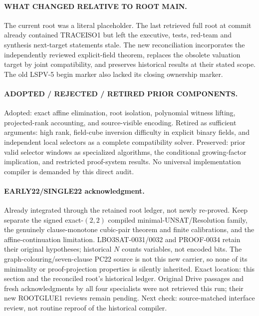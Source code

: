 \documentclass[11pt]{article}
\begin{document}
\paragraph{WHAT CHANGED RELATIVE TO ROOT MAIN.}
The current root was a literal placeholder. The last retrieved full root at
commit  already contained
TRACEISO1 but left the executive, tests, red-team and synthesis next-target
statements stale. The new reconciliation incorporates the independently
reviewed explicit-field theorem, replaces the obsolete valuation target by
joint compatibility, and preserves historical results at their stated scope.
The old LSPV-5 begin marker also lacked its closing ownership marker.

\paragraph{ADOPTED / REJECTED / RETIRED PRIOR COMPONENTS.}
Adopted: exact affine elimination, root isolation, polynomial witness lifting,
projected-rank accounting, and source-visible encoding. Retired as sufficient
arguments: high rank, field-cube inversion difficulty in explicit binary
fields, and independent local selectors as a complete compatibility solver.
Preserved: prior valid selector windows as specialized algorithms, the
conditional growing-factor implication, and restricted proof-system results.
No universal implementation compiler is demanded by this direct audit.

\paragraph{EARLY22/SINGLE22 acknowledgment.}
Already integrated through the retained root ledger, not newly re-proved.
Keep separate the signed exact-$(2,2)$ compiled minimal-UNSAT/Resolution
family, the genuinely clause-monotone cubic-pair theorem and finite
calibrations, and the affine-continuation limitation. LBO3SAT-0031/0032 and
PROOF-0034 retain their original hypotheses; historical $N$ counts variables,
not encoded bits. The graph-colouring/seven-clause PC22 source is not this
new carrier, so none of its minimality or proof-projection properties is
silently inherited. Exact location: this section and the reconciled root's
historical ledger. Original Drive passages and fresh acknowledgments by all
four specialists were not retrieved this run; their new ROOTGLUE1 reviews
remain pending. Next check: source-matched interface review, not routine
reproof of the historical compiler.
\end{document}
